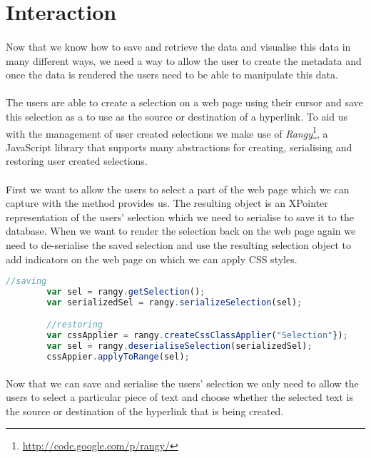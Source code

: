 	\section{Interaction} \label{sec:Interaction}
	\paragraph{}
	Now that we know how to save and retrieve the data and visualise this data in many different ways, we need a way to allow the user to create the metadata and once the data is rendered the users need to be able to manipulate this data.
	\paragraph{}
	The users are able to create a selection on a web page using their cursor and save this selection as a  to use as the source or destination of a hyperlink. To aid us with the management of user created selections we make use of \emph{Rangy}\footnote{\url{http://code.google.com/p/rangy/}}, a JavaScript library that supports many abstractions for creating, serialising and restoring user created selections.
	\paragraph{}
	First we want to allow the users to select a part of the web page which we can capture with the  method  provides us. The resulting object is an XPointer representation of the users' selection which we need to serialise to save it to the database. When we want to render the selection back on the web page again we need to de-serialise the saved selection and use the resulting selection object to add indicators on the web page on which we can apply CSS styles.\\
	\begin{lstlisting}[language=JavaScript]
		//saving
		var sel = rangy.getSelection();
		var serializedSel = rangy.serializeSelection(sel);

		//restoring
		var cssApplier = rangy.createCssClassApplier("Selection"});
		var sel = rangy.deserialiseSelection(serializedSel);
		cssAppier.applyToRange(sel);
	\end{lstlisting}
	\paragraph{}
	Now that we can save and serialise the users' selection we only need to allow the users to select a particular piece of text and choose whether the selected text is the source or destination of the hyperlink that is being created.

